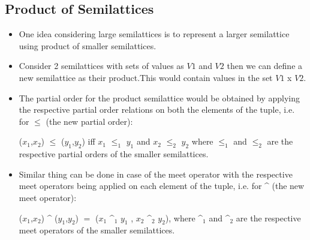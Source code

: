 \subsection{Product of Semilattices}
\begin{itemize}
    \item One idea considering large semilattices is to represent a larger semilattice using product of smaller semilattices.
    \item Consider 2 semilattices with sets of values as $V1$ and $V2$ then we can define a new semilattice as their product.This would contain values in the set $V1$ x $V2$. 
    \item The partial order for the product semilattice would be obtained by applying the respective partial order relations on both the elements of the tuple, i.e. for $\leq$ (the new partial order):
    \par
    ($x_{1}$,$x_{2}$) $\leq$ ($y_{1}$,$y_{2}$) iff $x_{1}$ $\leq_{1}$ $y_{1}$ and $x_{2}$ $\leq_{2}$ $y_{2}$ where $\leq_{1}$ and $\leq_{2}$ are the respective partial orders of the smaller semilattices. 
    \item Similar thing can be done in case of the meet operator with the respective meet operators being applied on each element of the tuple, i.e. for \^{} (the new meet operator):
    \par
    ($x_{1}$,$x_{2}$) \^{} ($y_{1}$,$y_{2}$) $=$ ($x_{1}$ \^{}$_{1}$ $y_{1}$ , $x_{2}$ \^{}$_{2}$ $y_{2}$), where \^{}$_{1}$ and \^{}$_{2}$ are the respective meet operators of the smaller semilattices.
\end{itemize}
